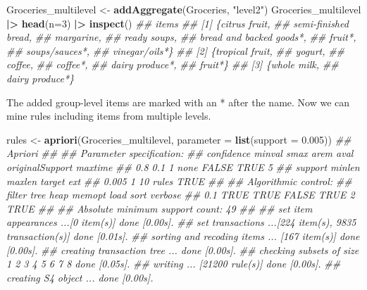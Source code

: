 \documentclass[
  notitlepage]{book}
\newenvironment{Shaded}{\begin{snugshade}}{\end{snugshade}}
\newcommand{\CommentTok}[1]{\textcolor[rgb]{0.56,0.35,0.01}{\textit{#1}}}
\newcommand{\DataTypeTok}[1]{\textcolor[rgb]{0.13,0.29,0.53}{#1}}
\newcommand{\DecValTok}[1]{\textcolor[rgb]{0.00,0.00,0.81}{#1}}
\newcommand{\ErrorTok}[1]{\textcolor[rgb]{0.64,0.00,0.00}{\textbf{#1}}}
\newcommand{\FloatTok}[1]{\textcolor[rgb]{0.00,0.00,0.81}{#1}}
\newcommand{\KeywordTok}[1]{\textcolor[rgb]{0.13,0.29,0.53}{\textbf{#1}}}
\newcommand{\NormalTok}[1]{#1}
\newcommand{\OperatorTok}[1]{\textcolor[rgb]{0.81,0.36,0.00}{\textbf{#1}}}
\newcommand{\StringTok}[1]{\textcolor[rgb]{0.31,0.60,0.02}{#1}}
\begin{document}
\begin{Shaded}
\begin{Highlighting}[]
\NormalTok{Groceries\_multilevel \textless{}{-}}\StringTok{ }\KeywordTok{addAggregate}\NormalTok{(Groceries, }\StringTok{"level2"}\NormalTok{)}
\NormalTok{Groceries\_multilevel }\OperatorTok{|}\ErrorTok{\textgreater{}}\StringTok{ }\KeywordTok{head}\NormalTok{(}\DataTypeTok{n=}\DecValTok{3}\NormalTok{) }\OperatorTok{|}\ErrorTok{\textgreater{}}\StringTok{ }\KeywordTok{inspect}\NormalTok{()}
\CommentTok{\#\#     items                     }
\CommentTok{\#\# [1] \{citrus fruit,            }
\CommentTok{\#\#      semi{-}finished bread,     }
\CommentTok{\#\#      margarine,               }
\CommentTok{\#\#      ready soups,             }
\CommentTok{\#\#      bread and backed goods*, }
\CommentTok{\#\#      fruit*,                  }
\CommentTok{\#\#      soups/sauces*,           }
\CommentTok{\#\#      vinegar/oils*\}           }
\CommentTok{\#\# [2] \{tropical fruit,          }
\CommentTok{\#\#      yogurt,                  }
\CommentTok{\#\#      coffee,                  }
\CommentTok{\#\#      coffee*,                 }
\CommentTok{\#\#      dairy produce*,          }
\CommentTok{\#\#      fruit*\}                  }
\CommentTok{\#\# [3] \{whole milk,              }
\CommentTok{\#\#      dairy produce*\}}
\end{Highlighting}
\end{Shaded}

The added group-level items are marked with an * after the name. Now we can mine rules
including items from multiple levels.

\begin{Shaded}
\begin{Highlighting}[]
\NormalTok{rules \textless{}{-}}\StringTok{ }\KeywordTok{apriori}\NormalTok{(Groceries\_multilevel,}
  \DataTypeTok{parameter =} \KeywordTok{list}\NormalTok{(}\DataTypeTok{support =} \FloatTok{0.005}\NormalTok{))}
\CommentTok{\#\# Apriori}
\CommentTok{\#\# }
\CommentTok{\#\# Parameter specification:}
\CommentTok{\#\#  confidence minval smax arem  aval originalSupport maxtime}
\CommentTok{\#\#         0.8    0.1    1 none FALSE            TRUE       5}
\CommentTok{\#\#  support minlen maxlen target  ext}
\CommentTok{\#\#    0.005      1     10  rules TRUE}
\CommentTok{\#\# }
\CommentTok{\#\# Algorithmic control:}
\CommentTok{\#\#  filter tree heap memopt load sort verbose}
\CommentTok{\#\#     0.1 TRUE TRUE  FALSE TRUE    2    TRUE}
\CommentTok{\#\# }
\CommentTok{\#\# Absolute minimum support count: 49 }
\CommentTok{\#\# }
\CommentTok{\#\# set item appearances ...[0 item(s)] done [0.00s].}
\CommentTok{\#\# set transactions ...[224 item(s), 9835 transaction(s)] done [0.01s].}
\CommentTok{\#\# sorting and recoding items ... [167 item(s)] done [0.00s].}
\CommentTok{\#\# creating transaction tree ... done [0.00s].}
\CommentTok{\#\# checking subsets of size 1 2 3 4 5 6 7 8 done [0.05s].}
\CommentTok{\#\# writing ... [21200 rule(s)] done [0.00s].}
\CommentTok{\#\# creating S4 object  ... done [0.00s].}
\end{Highlighting}
\end{Shaded}
\end{document}
